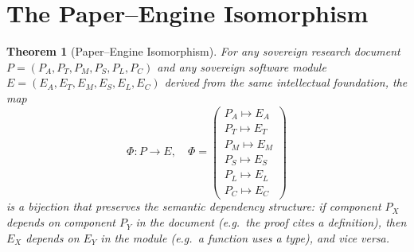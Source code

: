 \documentclass[12pt]{article}
\newtheorem{theorem}{Theorem}
\begin{document}
\section{The Paper--Engine Isomorphism}
\label{sec:isomorphism}

\begin{theorem}[Paper--Engine Isomorphism]
  For any sovereign research document $P = (P_A, P_T, P_M, P_S, P_L, P_C)$
  and any sovereign software module $E = (E_A, E_T, E_M, E_S, E_L, E_C)$
  derived from the same intellectual foundation, the map
  \[
    \Phi: P \to E, \quad
    \Phi = \begin{pmatrix}
      P_A \mapsto E_A \\
      P_T \mapsto E_T \\
      P_M \mapsto E_M \\
      P_S \mapsto E_S \\
      P_L \mapsto E_L \\
      P_C \mapsto E_C
    \end{pmatrix}
  \]
  is a bijection that preserves the semantic dependency structure: if component
  $P_X$ depends on component $P_Y$ in the document (e.g.\ the proof cites a
  definition), then $E_X$ depends on $E_Y$ in the module (e.g.\ a function
  uses a type), and vice versa.
\end{theorem}
\end{document}
